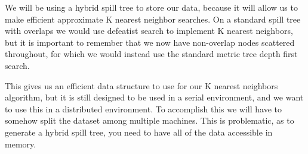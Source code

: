 \vspace{5 mm}
\noindent
We will be using a hybrid spill tree to store our data, because it will allow us
to make efficient approximate K nearest neighbor searches.  On a standard spill
tree with overlaps we would use defeatist search to implement K nearest
neighbors,  but it is important to remember that we now have non-overlap nodes
scattered  throughout, for which we would instead use the standard metric tree
depth first search.

\vspace{5 mm}
\noindent
This gives us an efficient data structure to use for our K nearest neighbors
algorithm, but it is still designed to be used in a serial environment, and we
want to use this in a distributed environment.  To accomplish this we will have
to somehow split the dataset among multiple machines.  This is problematic, as
to generate a hybrid spill tree, you need to have all of the data accessible in
memory.


